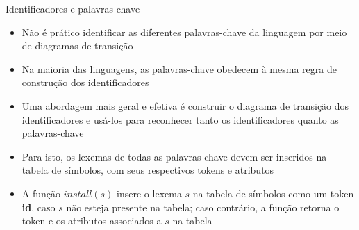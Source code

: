 \begin{frame}[fragile]{Identificadores e palavras-chave}

    \begin{itemize}
        \item Não é prático identificar as diferentes palavras-chave da linguagem por meio de diagramas de transição
        \pause

        \item Na maioria das linguagens, as palavras-chave obedecem à mesma regra de construção dos identificadores
        \pause

        \item Uma abordagem mais geral e efetiva é construir o diagrama de transição dos identificadores e usá-los para reconhecer tanto os identificadores
            quanto as palavras-chave
        \pause

        \item Para isto, os lexemas de todas as palavras-chave devem ser inseridos na tabela de símbolos, com seus respectivos tokens e atributos
        \pause

        \item A função $install(s)$ insere o lexema $s$ na tabela de símbolos como um token \textbf{id}, caso $s$ não esteja presente na tabela; caso
            contrário, a função retorna o token e os atributos associados a $s$ na tabela
    \end{itemize}

\end{frame}

